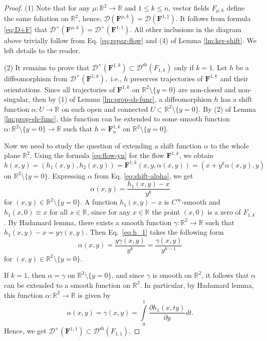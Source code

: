 \documentclass[10pt,reqno]{amsart}
\newcommand{\bbR}{\mathbb{R}}
\newcommand{\bfF}{\mathbf{F}}
\begin{document}
\begin{proof}	
	(1)  Note that for any $\mu:\bbR^2\to \bbR$ and $1\leq k\leq n$, vector fields $F_{\mu,k}$ define the same foliation on $\bbR^2$, hence, $\mathcal{D}(\bfF^{\mu,k}) = \mathcal{D}(\bfF^{1,1})$. It follows from formula \eqref{eq:D+F} that $\mathcal{D}^+(\bfF^{\mu,k}) = \mathcal{D}^+(\bfF^{1,1})$.
	All other inclusions in the diagram above trivially follow from  Eq. \eqref{eq:repar-flow} and (4) of Lemma  \ref{lm:ker-shift}. We left details to the reader.

	(2) 
	It remains to prove that $\mathcal{D}^+(\bfF^{1,k})\subset \mathcal{D}^{\mathrm{sh}}(F_{1,k})$ only if $k = 1$. 
	Let  $h$ be a diffeomorphism  from $\mathcal{D}^{+}(\bfF^{1,k}),$ i.e.,    $h$ preserves  trajectories of $\bfF^{1,k}$ and their orientations. 
	Since all trajectories of $\bfF^{1,k}$ on $\bbR^2\setminus \{y = 0\}$ are non-closed and non-singular, then by (1) of Lemma \ref{lm:prop-sh-func}, a diffeomorphism $h$ has a shift function $\alpha:U\to \bbR$ on each open and connected  $U\subset \bbR^2\setminus \{y= 0\}$. By (2) of Lemma \ref{lm:prop-sh-func},  this function can be extended to some smooth function $\alpha:\bbR^2\setminus\{y = 0\}\to \bbR$ such that $h = \bfF^{1,k}_{\alpha}$ on $\bbR^2\setminus \{y= 0\}.$  

	Now we need to study the question of extending a shift function $\alpha$ to the whole plane $\bbR^2$.
	Using the  formula \eqref{eq:flow-yn} for the flow $\bfF^{1,k}$, we obtain
	\begin{equation}\label{eq:shift-alpha}
	h(x,y) = (h_1(x,y), h_2(x,y)) =\mathbf{F}^{1,k}(x,y,\alpha(x,y)) = (x+y^k\alpha(x,y), y)
	\end{equation}
	on $\bbR^2\setminus \{y=0\}.$
	Expressing $\alpha$ from Eq. \eqref{eq:shift-alpha}, we get
	\begin{equation}\label{eq:h_1}
		\alpha(x,y) = \frac{h_1(x,y)-x}{y^k}
	\end{equation}
	for $(x,y)\in \bbR^2\setminus \{y=0\}.$ A function $h_1(x,y)-x$ is  $C^{\infty}$-smooth and {$h_1(x,0)\equiv x$} for all $x\in \bbR$, since for any $x\in\bbR$ the point $(x,0)$ is a zero  of  $F_{1,k}$. By {Hadamard lemma, there exists a smooth function $\gamma:\bbR^2\to \bbR$ such that $h_1(x,y)-x = y\gamma(x,y)$}.
	Then Eq.~\eqref{eq:h_1} takes the following form
	$$
	\alpha(x,y) = \frac{y\gamma(x,y)}{y^k} = \frac{\gamma(x,y)}{y^{k-1}}
	$$
	for $(x,y)\in \bbR^2\setminus \{y = 0\}.$ 
	
	If $k = 1$, then $\alpha = \gamma$ on $\bbR^2\setminus \{y=0\}$, and since $\gamma$ is smooth on $\bbR^2$, it follows that $\alpha$ can be extended to a smooth function on $\bbR^2$. In particular, by Hadamard lemma, this function $\alpha:\bbR^2\to \bbR$ is given by
	 $$
	\alpha(x,y) =  \gamma (x,y) = \int\limits_0^1\frac{\partial h_1(x, ty)}{\partial y}dt.
	$$
	Hence,  we get $\mathcal{D}^+(\bfF^{1,1})\subset \mathcal{D}^{\mathrm{sh}}(F_{1,1})$.
\end{proof}
\end{document}
